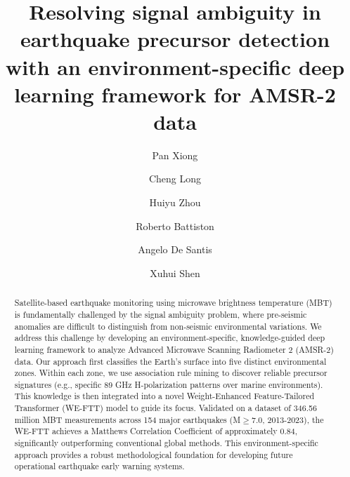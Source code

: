 \documentclass[preprint,review,12pt,authoryear]{elsarticle}
\begin{document}
\begin{frontmatter}

\title{Resolving signal ambiguity in earthquake precursor detection with an environment-specific deep learning framework for AMSR-2 data}

\author[inst1]{Pan Xiong}
\author[inst2]{Cheng Long}
\author[inst3]{Huiyu Zhou}
\author[inst4,inst5]{Roberto Battiston}
\author[inst6]{Angelo De Santis}
\author[inst7]{Xuhui Shen}



\begin{abstract}
Satellite-based earthquake monitoring using microwave brightness temperature (MBT) is fundamentally challenged by the signal ambiguity problem, where pre-seismic anomalies are difficult to distinguish from non-seismic environmental variations. We address this challenge by developing an environment-specific, knowledge-guided deep learning framework to analyze Advanced Microwave Scanning Radiometer 2 (AMSR-2) data. Our approach first classifies the Earth's surface into five distinct environmental zones. Within each zone, we use association rule mining to discover reliable precursor signatures (e.g., specific 89 GHz H-polarization patterns over marine environments). This knowledge is then integrated into a novel Weight-Enhanced Feature-Tailored Transformer (WE-FTT) model to guide its focus. Validated on a dataset of 346.56 million MBT measurements across 154 major earthquakes (M$\ge$7.0, 2013-2023), the WE-FTT achieves a Matthews Correlation Coefficient of approximately 0.84, significantly outperforming conventional global methods. This environment-specific approach provides a robust methodological foundation for developing future operational earthquake early warning systems.
\end{abstract}


\end{frontmatter}
\end{document}
